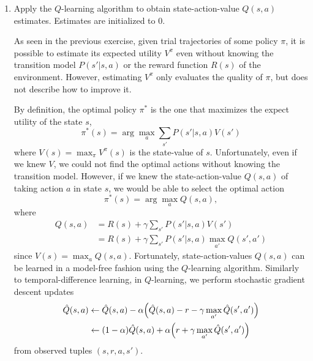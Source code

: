 \documentclass[11pt, a4paper]{article}
\begin{document}
\begin{enumerate}
    \item Apply the $Q$-learning algorithm to obtain state-action-value $Q(s, a)$ estimates. Estimates are initialized to $0$.

    \begin{solution}
        As seen in the previous exercise, given trial trajectories of some policy $\pi$, it is possible to estimate its expected utility $V^\pi$ even without knowing the transition model $P(s' | s, a)$ or the reward function $R(s)$ of the environment. However, estimating $V^\pi$ only evaluates the quality of $\pi$, but does not describe how to improve it.

        By definition, the optimal policy $\pi^*$ is the one that maximizes the expect utility of the state $s$, \ie{}
        \begin{equation*}
            \pi^*(s) = \arg \max_a \sum_{s'} P(s' | s, a) V(s')
        \end{equation*}
        where $V(s) = \max_\pi V^\pi(s)$ is the state-value of $s$. Unfortunately, even if we knew $V$, we could not find the optimal actions without knowing the transition model. However, if we knew the state-action-value $Q(s, a)$ of taking action $a$ in state $s$, we would be able to select the optimal action
        \begin{equation*}
            \pi^*(s) = \arg \max_a Q(s, a) ,
        \end{equation*}
        where
        \begin{align*}
            Q(s, a) & = R(s) + \gamma \sum_{s'} P(s' | s, a) V(s') \\
            & = R(s) + \gamma \sum_{s'} P(s' | s, a) \max_{a'} Q(s', a')
        \end{align*}
        since $V(s) = \max_a Q(s, a)$. Fortunately, state-action-values $Q(s, a)$ can be learned in a model-free fashion using the $Q$-learning algorithm. Similarly to temporal-difference learning, in $Q$-learning, we perform stochastic gradient descent updates
        \begin{align*}
            \hat{Q}(s, a) & \gets \hat{Q}(s, a) - \alpha \rbk*{\hat{Q}(s, a) - r - \gamma \max_{a'} \hat{Q}(s', a')} \\
            & \gets (1 - \alpha) \hat{Q}(s, a) + \alpha \rbk*{r + \gamma \max_{a'} \hat{Q}(s', a')}
        \end{align*}
        from observed tuples $(s, r, a, s')$.


\end{solution}
\end{enumerate}
\end{document}
